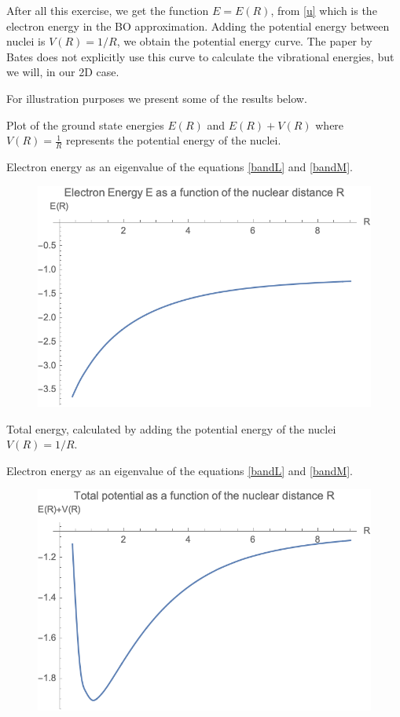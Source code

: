 After all this exercise, we get the function $ E = E(R) $, from \eqref{u} which is the electron energy in the BO approximation. Adding the potential energy between nuclei is $ V(R) = 1/R $, we obtain the potential energy curve. The paper by Bates does not explicitly use this curve to calculate the vibrational energies, but we will, in our 2D case.

For illustration purposes we present some of the results below.

Plot of the ground state energies $ E(R) $ and $ E(R) + V(R) $ where $ V(R) = \frac{1}{R} $ represents the potential energy of the nuclei.

Electron energy as an eigenvalue of the equations \eqref{bandL} and \eqref{bandM}.
\begin{figure}
  \includegraphics{Bates3DEofR-2.png}
\end{figure}

Total energy, calculated by adding the potential energy of the nuclei $ V(R) = 1/R $.

Electron energy as an eigenvalue of the equations \eqref{bandL} and \eqref{bandM}.
\begin{figure}
  \includegraphics{Bates3DEofRPlusVofR-2.png}
\end{figure}

